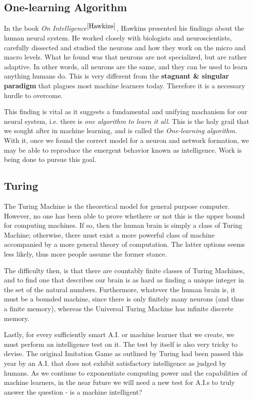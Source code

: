 \documentclass[12pt]{article}  %
\begin{document}
\subsection{One-learning Algorithm}\label{one-alg}

In the book \emph{On Intelligence}$^{\ref{Hawkins}}$, Hawkins presented his findings about the human neural system. He worked closely with biologists and neuroscientists, carefully dissected and studied the neurons and how they work on the micro and macro levels. What he found was that neurons are not specialized, but are rather adaptive. In other words, all neurons are the same, and they can be used to learn anything humans do. This is very different from the {\bf stagnant \& singular paradigm} that plagues most machine learners today. Therefore it is a necessary hurdle to overcome.

This finding is vital as it suggests a fundamental and unifying machanism for our neural system, i.e. there is \emph{one algorithm to learn it all}. This is the holy grail that we sought after in machine learning, and is called the \emph{One-learning algorithm}. With it, once we found the correct model for a neuron and network formation, we may be able to reproduce the emergent behavior known as intelligence. Work is being done to pursue this goal.

\subsection{Turing}

The Turing Machine is the theoretical model for general purpose computer. However, no one has been able to prove whethere or not this is the upper bound for computing machines. If so, then the human brain is simply a class of Turing Machine; otherwise, there must exist a more powerful class of machine accompanied by a more general theory of computation. The latter options seems less likely, thus more people assume the former stance.

The difficulty then, is that there are countably finite classes of Turing Machines, and to find one that describes our brain is as hard as finding a unique integer in the set of the natural numbers. Furthermore, whatever the human brain is, it must be a bounded machine, since there is only finitely many neurons (and thus a finite memory), whereas the Universal Turing Machine has infinite discrete memory.

Lastly, for every sufficiently smart A.I. or machine learner that we create, we must perform an intelligence test on it. The test by itself is also very tricky to devise. The original Imitation Game as outlined by Turing had been passed this year by an A.I. that does not exhibit satisfactory intelligence as judged by humans. As we continue to exponentiate computing power and the capabilities of machine learners, in the near future we will need a new test for A.I.s to truly answer the question - is a machine intelligent?
\end{document}
